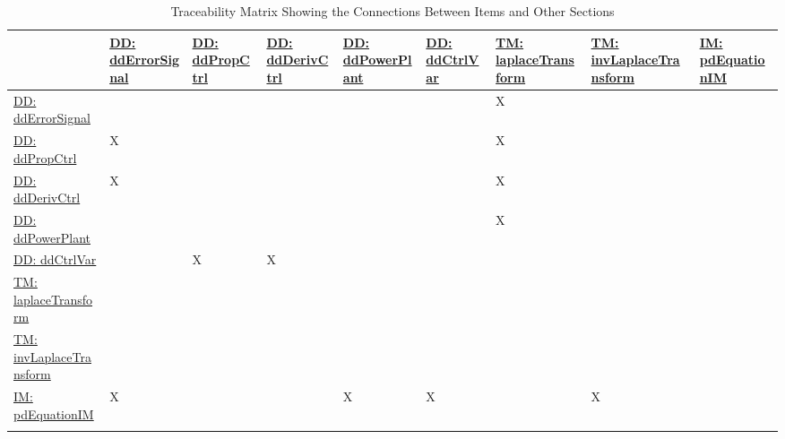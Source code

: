 \documentclass[12pt]{article}
\begin{document}
\begin{longtable}{l l l l l l l l l}
\toprule
\textbf{} & \textbf{\hyperref[DD:ddErrorSignal]{DD: ddErrorSignal}} & \textbf{\hyperref[DD:ddPropCtrl]{DD: ddPropCtrl}} & \textbf{\hyperref[DD:ddDerivCtrl]{DD: ddDerivCtrl}} & \textbf{\hyperref[DD:ddPowerPlant]{DD: ddPowerPlant}} & \textbf{\hyperref[DD:ddCtrlVar]{DD: ddCtrlVar}} & \textbf{\hyperref[TM:laplaceTransform]{TM: laplaceTransform}} & \textbf{\hyperref[TM:invLaplaceTransform]{TM: invLaplaceTransform}} & \textbf{\hyperref[IM:pdEquationIM]{IM: pdEquationIM}}
\\
\midrule
\endhead
\hyperref[DD:ddErrorSignal]{DD: ddErrorSignal} &  &  &  &  &  & X &  & 
\\
\hyperref[DD:ddPropCtrl]{DD: ddPropCtrl} & X &  &  &  &  & X &  & 
\\
\hyperref[DD:ddDerivCtrl]{DD: ddDerivCtrl} & X &  &  &  &  & X &  & 
\\
\hyperref[DD:ddPowerPlant]{DD: ddPowerPlant} &  &  &  &  &  & X &  & 
\\
\hyperref[DD:ddCtrlVar]{DD: ddCtrlVar} &  & X & X &  &  &  &  & 
\\
\hyperref[TM:laplaceTransform]{TM: laplaceTransform} &  &  &  &  &  &  &  & 
\\
\hyperref[TM:invLaplaceTransform]{TM: invLaplaceTransform} &  &  &  &  &  &  &  & 
\\
\hyperref[IM:pdEquationIM]{IM: pdEquationIM} & X &  &  & X & X &  & X & 
\\
\bottomrule
\caption{Traceability Matrix Showing the Connections Between Items and Other Sections}
\label{Table:TraceMatRefvsRef}
\end{longtable}
\end{document}
